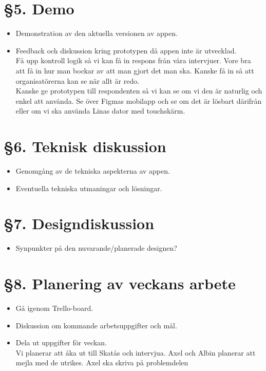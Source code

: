 \documentclass[a4paper, 11pt]{article}
\begin{document}
\section*{§5. Demo}

\begin{itemize}
    \item Demonstration av den aktuella versionen av appen.\\
    \item Feedback och diskussion kring prototypen då appen inte är utvecklad.\\
    Få upp kontroll logik så vi kan få in respons från våra intervjuer. Vore bra att få in hur man bockar av att man gjort det man ska. Kanske få in så att organisatörerna kan se när allt är redo. \\
    Kanske ge prototypen till respondenten så vi kan se om vi den är naturlig och enkel att använda. Se över Figmas mobilapp och se om det är lösbart därifrån eller om vi ska använda Linas dator med touchskärm.  
\end{itemize}

\section*{§6. Teknisk diskussion}

\begin{itemize}
    \item Genomgång av de tekniska aspekterna av appen.\\
    
    \item Eventuella tekniska utmaningar och lösningar.\\
    
\end{itemize}

\section*{§7. Designdiskussion}

\begin{itemize}
    \item Synpunkter på den nuvarande/planerade designen? \\
    
    
\end{itemize}

\section*{§8. Planering av veckans arbete}
\begin{itemize}
    \item Gå igenom Trello-board.\\
    \item Diskussion om kommande arbetsuppgifter och mål.\\
    \item Dela ut uppgifter för veckan.\\
    Vi planerar att åka ut till Skatås och intervjua. Axel och Albin planerar att mejla med de utrikes.
    Axel ska skriva på problemdelen
\end{itemize}
\end{document}
